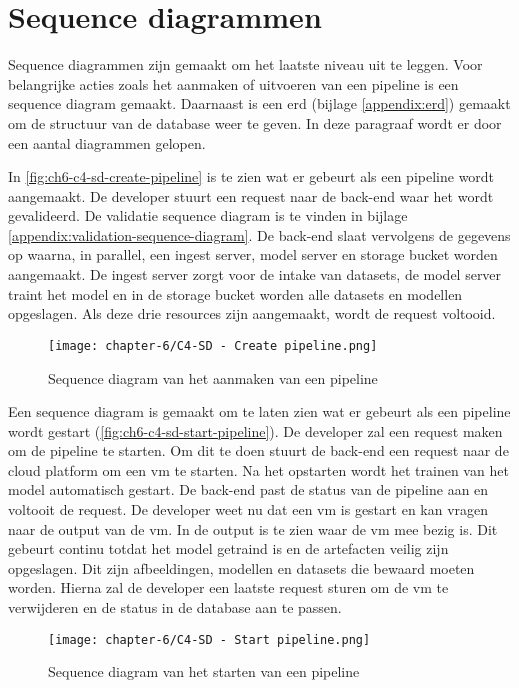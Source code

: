 \section{Sequence diagrammen}\label{sec:ch6-sequence-diagrammen}
Sequence diagrammen zijn gemaakt om het laatste niveau uit te leggen. Voor belangrijke acties zoals het aanmaken of uitvoeren van een pipeline is een sequence diagram gemaakt. Daarnaast is een \acrshort{erd} (bijlage \ref{appendix:erd}) gemaakt om de structuur van de database weer te geven. In deze paragraaf wordt er door een aantal diagrammen gelopen.

In \autoref{fig:ch6-c4-sd-create-pipeline} is te zien wat er gebeurt als een pipeline wordt aangemaakt. De developer stuurt een request naar de back-end waar het wordt gevalideerd. De validatie sequence diagram is te vinden in bijlage \ref{appendix:validation-sequence-diagram}. De back-end slaat vervolgens de gegevens op waarna, in parallel, een ingest server, model server en storage bucket worden aangemaakt. De ingest server zorgt voor de intake van datasets, de model server traint het model en in de storage bucket worden alle datasets en modellen opgeslagen. Als deze drie resources zijn aangemaakt, wordt de request voltooid.

\begin{figure}[hbt!]
  \centering
  \texttt{[image: chapter-6/C4-SD - Create pipeline.png]}
  \caption{Sequence diagram van het aanmaken van een pipeline}
  \label{fig:ch6-c4-sd-create-pipeline}
\end{figure}

Een sequence diagram is gemaakt om te laten zien wat er gebeurt als een pipeline wordt gestart (\autoref{fig:ch6-c4-sd-start-pipeline}). De developer zal een request maken om de pipeline te starten. Om dit te doen stuurt de back-end een request naar de cloud platform om een \acrfull{vm} te starten. Na het opstarten wordt het trainen van het model automatisch gestart. De back-end past de status van de pipeline aan en voltooit de request. De developer weet nu dat een \acrshort{vm} is gestart en kan vragen naar de output van de \acrshort{vm}. In de output is te zien waar de \acrshort{vm} mee bezig is. Dit gebeurt continu totdat het model getraind is en de artefacten veilig zijn opgeslagen. Dit zijn afbeeldingen, modellen en datasets die bewaard moeten worden. Hierna zal de developer een laatste request sturen om de \acrshort{vm} te verwijderen en de status in de database aan te passen.

\clearpage

\begin{figure}[hbt!]
  \centering
  \texttt{[image: chapter-6/C4-SD - Start pipeline.png]}
  \caption{Sequence diagram van het starten van een pipeline}
  \label{fig:ch6-c4-sd-start-pipeline}
\end{figure}

